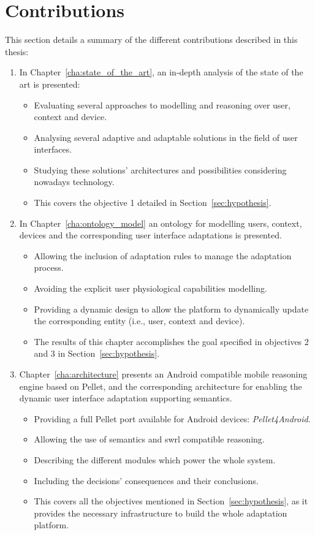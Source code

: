 \section{Contributions}
\label{sec:contributions}

This section details a summary of the different contributions described in this
thesis: 

\begin{enumerate}[label=\alph*)]
  \item In Chapter~\ref{cha:state_of_the_art}, an in-depth analysis of the state 
  of the art is presented:
  \begin{itemize}
    \item Evaluating several approaches to modelling and reasoning over user,
    context and device.
    \item Analysing several adaptive and adaptable solutions in the field of
    user interfaces.
    \item Studying these solutions' architectures and possibilities considering
    nowadays technology.
    \item This covers the objective 1 detailed in Section~\ref{sec:hypothesis}.
  \end{itemize}
  
  \item In Chapter~\ref{cha:ontology_model} an ontology for modelling users, 
  context, devices and the corresponding user interface adaptations is presented.
  \begin{itemize}
    \item Allowing the inclusion of adaptation rules to manage the adaptation 
    process.
    \item Avoiding the explicit user physiological capabilities modelling.
    \item Providing a dynamic design to allow the platform to dynamically update
    the corresponding entity (i.e., user, context and device).
    \item The results of this chapter accomplishes the goal specified in
    objectives 2 and 3 in Section~\ref{sec:hypothesis}.
  \end{itemize}

  \item Chapter~\ref{cha:architecture} presents an Android compatible mobile 
  reasoning engine based on Pellet, and the corresponding architecture
  for enabling the dynamic user interface adaptation supporting semantics.
  \begin{itemize}
    \item Providing a full Pellet port available for Android devices: \textit{Pellet4Android}.
    \item Allowing the use of semantics and \ac{swrl} compatible reasoning.
    \item Describing the different modules which power the whole system.
    \item Including the decisions' consequences and their conclusions.
    \item This covers all the objectives mentioned in Section~\ref{sec:hypothesis},
    as it provides the necessary infrastructure to build the whole adaptation
    platform.
  \end{itemize}


\end{enumerate}
